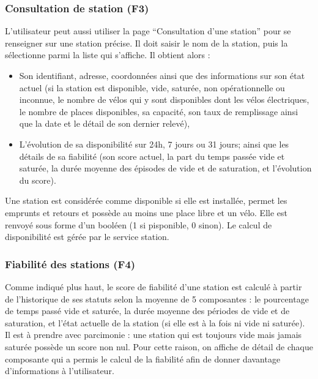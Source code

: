 \documentclass[
  french,
  11pt,
  a4paper,
]{article}
\begin{document}
\subsubsection{Consultation de station
(F3)}\label{consultation-de-station-f3}

L'utilisateur peut aussi utiliser la page ``Consultation d'une station''
pour se renseigner sur une station précise. Il doit saisir le nom de la
station, puis la sélectionne parmi la liste qui s'affiche. Il obtient
alors :

\begin{itemize}
\item
  Son identifiant, adresse, coordonnées ainsi que des informations sur
  son état actuel (si la station est disponible, vide, saturée, non
  opérationnelle ou inconnue, le nombre de vélos qui y sont disponibles
  dont les vélos électriques, le nombre de places disponibles, sa
  capacité, son taux de remplissage ainsi que la date et le détail de
  son dernier relevé),
\item
  L'évolution de sa disponibilité sur 24h, 7 jours ou 31 jours; ainsi
  que les détails de sa fiabilité (son score actuel, la part du temps
  passée vide et saturée, la durée moyenne des épisodes de vide et de
  saturation, et l'évolution du score).
\end{itemize}

Une station est considérée comme disponible si elle est installée,
permet les emprunts et retours et possède au moins une place libre et un
vélo. Elle est renvoyé sous forme d'un booléen (1 si pisponible, 0
sinon). Le calcul de disponibilité est gérée par le service station.

\subsubsection{Fiabilité des stations
(F4)}\label{fiabilituxe9-des-stations-f4}

Comme indiqué plus haut, le score de fiabilité d'une station est calculé
à partir de l'historique de ses statuts selon la moyenne de 5
composantes : le pourcentage de temps passé vide et saturée, la durée
moyenne des périodes de vide et de saturation, et l'état actuelle de la
station (si elle est à la fois ni vide ni saturée). Il est à prendre
avec parcimonie : une station qui est toujours vide mais jamais saturée
possède un score non nul. Pour cette raison, on affiche de détail de
chaque composante qui a permis le calcul de la fiabilité afin de donner
davantage d'informations à l'utilisateur.
\end{document}
